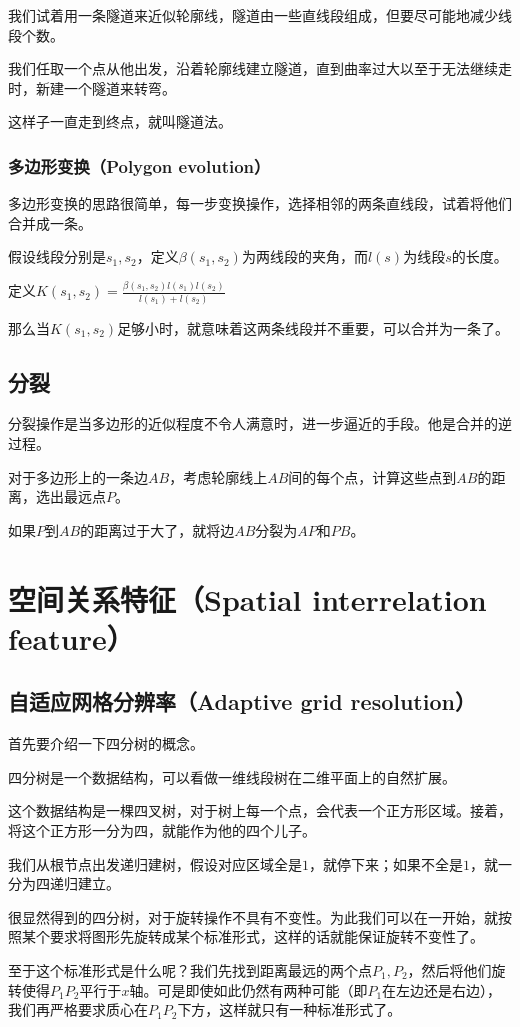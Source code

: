 \documentclass{ctexart}
\begin{document}
我们试着用一条隧道来近似轮廓线，隧道由一些直线段组成，但要尽可能地减少线段个数。

我们任取一个点从他出发，沿着轮廓线建立隧道，直到曲率过大以至于无法继续走时，新建一个隧道来转弯。

这样子一直走到终点，就叫隧道法。
\subsubsection{多边形变换（Polygon evolution）}

多边形变换的思路很简单，每一步变换操作，选择相邻的两条直线段，试着将他们合并成一条。

假设线段分别是$s_1,s_2$，定义$\beta(s_1,s_2)$为两线段的夹角，而$l(s)$为线段$s$的长度。

定义$K(s_1,s_2)=\frac{\beta(s_1,s_2)l(s_1)l(s_2)}{l(s_1)+l(s_2)}$

那么当$K(s_1,s_2)$足够小时，就意味着这两条线段并不重要，可以合并为一条了。
\subsection{分裂}

分裂操作是当多边形的近似程度不令人满意时，进一步逼近的手段。他是合并的逆过程。

对于多边形上的一条边$AB$，考虑轮廓线上$AB$间的每个点，计算这些点到$AB$的距离，选出最远点$P$。

如果$P$到$AB$的距离过于大了，就将边$AB$分裂为$AP$和$PB$。
\section{空间关系特征（Spatial interrelation feature）}
\subsection{自适应网格分辨率（Adaptive grid resolution）}
首先要介绍一下四分树的概念。

四分树是一个数据结构，可以看做一维线段树在二维平面上的自然扩展。

这个数据结构是一棵四叉树，对于树上每一个点，会代表一个正方形区域。接着，将这个正方形一分为四，就能作为他的四个儿子。

我们从根节点出发递归建树，假设对应区域全是$1$，就停下来；如果不全是$1$，就一分为四递归建立。

很显然得到的四分树，对于旋转操作不具有不变性。为此我们可以在一开始，就按照某个要求将图形先旋转成某个标准形式，这样的话就能保证旋转不变性了。

至于这个标准形式是什么呢？我们先找到距离最远的两个点$P_1,P_2$，然后将他们旋转使得$P_1P_2$平行于$x$轴。可是即使如此仍然有两种可能（即$P_1$在左边还是右边），我们再严格要求质心在$P_1P_2$下方，这样就只有一种标准形式了。
\end{document}
